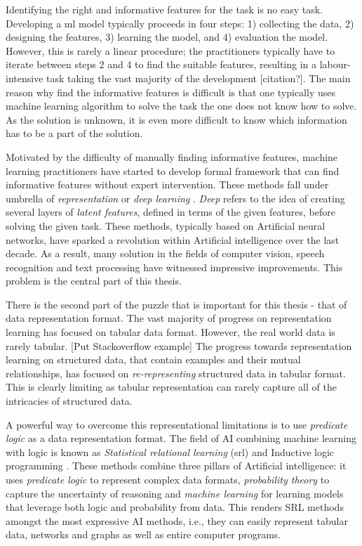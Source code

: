 Identifying the right and informative features for the task is no easy task.
Developing a \gls{ml} model typically proceeds in four steps: 1) collecting the data, 2) designing the features, 3) learning the model, and 4) evaluation the model.
However, this is rarely a linear procedure; the practitioners typically have to iterate between steps 2 and 4 to find the suitable features, resulting in a labour-intensive task taking the vast majority of the development [citation?].
The main reason why find the informative features is difficult is that one typically uses machine learning algorithm to solve the task the one does not know how to solve.
As the solution is unknown, it is even more difficult to know which information has to be a part of the solution.



Motivated by the difficulty of manually finding informative features, machine learning practitioners have started to develop formal framework that can find informative features without expert intervention.
These methods fall under umbrella of \textit{representation} or \textit{deep learning} \cite{Goodfellow2016, Bengio:2009}.
\textit{Deep} refers to the idea of creating several layers of \textit{latent features}, defined in terms of the given features, before solving the given task.
These methods, typically based on Artificial neural networks, have sparked a revolution within Artificial intelligence over the last decade.
As a result, many solution in the fields of computer vision, speech recognition and text processing have witnessed impressive improvements.
This problem is the central part of this thesis.



There is the second part of the puzzle that is important for this thesis - that of data representation format.
The vast majority of progress on representation learning has focused on tabular data format.
However, the real world data is rarely tabular. [Put Stackoverflow example]
The progress towards representation learning on structured data, that contain examples and their mutual relationships, has focused on \textit{re-representing} structured data in tabular format.
This is clearly limiting as tabular representation can rarely capture all of the intricacies of structured data. 



A powerful way to overcome this representational limitations is to use \textit{predicate logic} as a data representation format. 
The field of AI combining machine learning with logic is known as \textit{Statistical relational learning} (\gls{srl}) \cite{GetoorSRL,Raedt:2016:SRA:3027718} and Inductive logic programming \cite{LucRLbook}.
These methods combine three pillars of Artificial intelligence: it uses \textit{predicate logic} to represent complex data formats, \textit{probability theory} to capture the uncertainty of reasoning and \textit{machine learning} for learning models that leverage both logic and probability from data.
This renders SRL methods amongst the most expressive AI methods, i.e., they can easily represent tabular data, networks and graphs as well as entire computer programs. 





